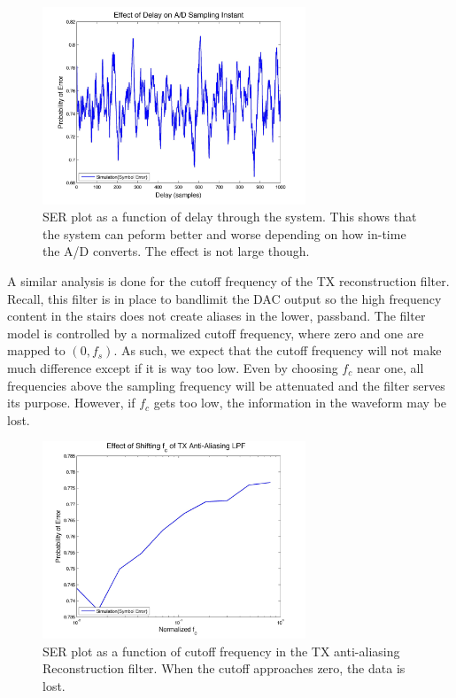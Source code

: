 \documentclass[]{article}
\begin{document}
\begin{figure}[H]
\centering
\hspace*{-2cm}\includegraphics[width=0.7\textwidth]{delaySensitivity.jpg}
\caption{SER plot as a function of delay through the system.  This shows that the system can peform better and worse depending on how in-time the A/D converts.  The effect is not large though. \label{fig:delay}}
\end{figure}

A similar analysis is done for the cutoff frequency of the TX reconstruction filter.   Recall, this filter is in place to bandlimit the DAC output so the high frequency content in the stairs does not create aliases in the lower, passband.  The filter model is controlled by a normalized cutoff frequency, where zero and one are mapped to $\left(0,f_s\right)$.  As such, we expect that the cutoff frequency will not make much difference except if it is way too low.  Even by choosing $f_c$ near one, all frequencies above the sampling frequency will be attenuated and the filter serves its purpose.  However, if $f_c$ gets too low, the information in the waveform may be lost.   \\

\begin{figure}[H]
\centering
\hspace*{-2cm}\includegraphics[width=0.7\textwidth]{freqTX.jpg}
\caption{SER plot as a function of cutoff frequency in the TX anti-aliasing Reconstruction filter.  When the cutoff approaches zero, the data is lost. \label{fig:freqTX}}
\end{figure}
\end{document}
